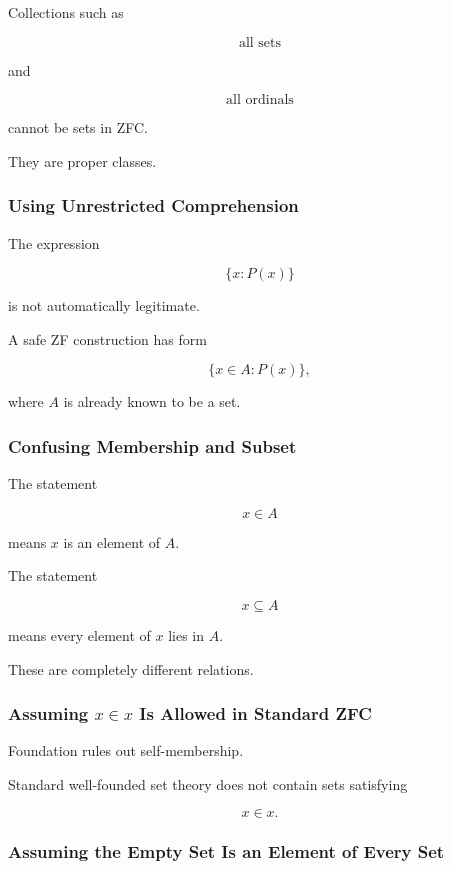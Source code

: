 Collections such as

\[
\boxed{
\text{all sets}
}
\]

and

\[
\boxed{
\text{all ordinals}
}
\]

cannot be sets in ZFC.

They are proper classes.

\subsubsection{Using Unrestricted Comprehension}

The expression

\[
\{x:P(x)\}
\]

is not automatically legitimate.

A safe ZF construction has form

\[
\boxed{
\{x\in A:P(x)\},
}
\]

where \(A\) is already known to be a set.

\subsubsection{Confusing Membership and Subset}

The statement

\[
x\in A
\]

means \(x\) is an element of \(A\).

The statement

\[
x\subseteq A
\]

means every element of \(x\) lies in \(A\).

These are completely different relations.

\subsubsection{Assuming \(x\in x\) Is Allowed in Standard ZFC}

Foundation rules out self-membership.

Standard well-founded set theory does not contain sets satisfying

\[
x\in x.
\]

\subsubsection{Assuming the Empty Set Is an Element of Every Set}

